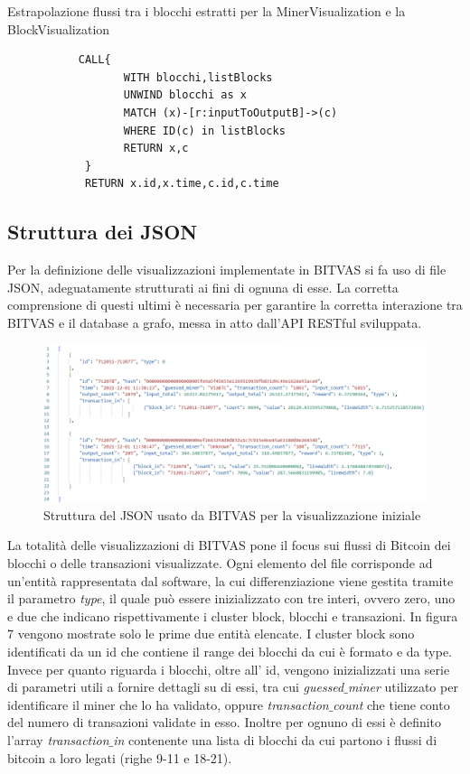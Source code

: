 \begin{center}
Estrapolazione flussi tra i blocchi estratti per la MinerVisualization e la BlockVisualization
\begin{lstlisting}
           CALL{
                  WITH blocchi,listBlocks
                  UNWIND blocchi as x
                  MATCH (x)-[r:inputToOutputB]->(c)
                  WHERE ID(c) in listBlocks
                  RETURN x,c
            }
            RETURN x.id,x.time,c.id,c.time

\end{lstlisting} 
\end{center}

\subsection{Struttura dei JSON} 
Per la definizione delle visualizzazioni implementate in BITVAS si fa uso di file JSON, adeguatamente strutturati ai fini di ognuna di esse.
La corretta comprensione di questi ultimi è necessaria per garantire la corretta interazione tra BITVAS e il database a grafo, messa in atto dall'API RESTful sviluppata.

\begin{figure}[H]
    \centering \includegraphics[keepaspectratio=true,scale=0.4]{Images/StrutturaJSON_BITVAS.png}
    \caption{Struttura del JSON usato da BITVAS per la visualizzazione iniziale}
\end{figure}

La totalità delle visualizzazioni di BITVAS pone il focus sui flussi di Bitcoin dei blocchi o delle transazioni visualizzate.
Ogni elemento del file corrisponde ad un'entità rappresentata dal software, la cui differenziazione viene gestita tramite il parametro \emph{type}, il quale può essere inizializzato con tre interi, ovvero zero, uno e due che indicano rispettivamente i cluster block, blocchi e transazioni.
In figura 7 vengono mostrate solo le prime due entità elencate.
I cluster block sono identificati da un id che contiene il range dei blocchi da cui è formato e da type.
Invece per quanto riguarda i blocchi, oltre all' id, vengono inizializzati una serie di parametri utili a fornire dettagli su di essi, tra cui \textit{guessed$\_$miner} utilizzato per identificare il miner che lo ha validato, oppure \textit{transaction$\_$count} che tiene conto del numero di transazioni validate in esso.
Inoltre per ognuno di essi è definito l'array \textit{transaction$\_$in} contenente una lista di blocchi da cui partono i flussi di bitcoin a loro legati (righe 9-11 e 18-21). 

